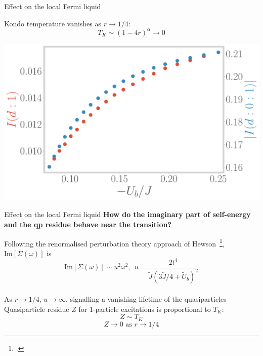 \documentclass[9pt,aspectratio=169]{beamer}
\begin{document}
\begin{frame}{Effect on the local Fermi liquid}
\begin{itemize}
{\begin{minipage}{0.45\textwidth}
	\nitem Kondo temperature vanishes as \(r \to 1/4\):
	\[T_K \sim (1- 4r)^\alpha \to 0\]
	\end{minipage}
	\hspace*{\fill}
	\begin{minipage}{0.45\textwidth}
	\includegraphics[width=\textwidth]{tripartite.pdf}
	\end{minipage}
}
\end{itemize}
\end{frame}

\begin{frame}{Effect on the local Fermi liquid}
	\textbf{How do the imaginary part of \alert{self-energy} and the \alert{qp residue} behave near the transition?}
	\vspace*{\fill}

\begin{itemize}
	\nitem Following the renormalised perturbation theory approach of Hewson~\footcite{hewson1993,coleman2015}, \(\text{Im}\left[\Sigma(\omega)\right] \) is
	\[\text{Im}\left[\Sigma(\omega)\right] \sim u^2 \omega^2, ~ ~ u = \frac{2t^4}{\tilde J\left(3\tilde J/4 + \tilde U_b \right)^2}\]\\[10pt]
	\nitem As \(r \to 1/4\), \(u \to \infty\), signalling a vanishing lifetime of the quasiparticles\\[20pt]
	\nitem Quasiparticle residue \(Z\) for 1-particle excitations is proportional to \(T_K\):
	\[Z \sim T_K\]
	\[Z \to 0 \text{ as }r \to 1/4\]
\end{itemize}
\end{frame}
\end{document}

